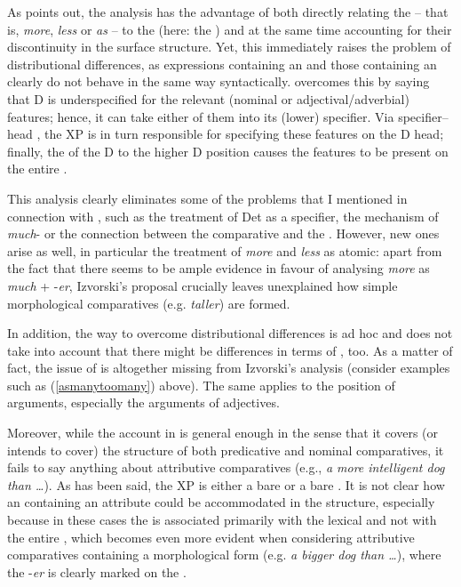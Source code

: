 As \citet[109--119]{izvorski1995} points out, the analysis has the advantage of both directly relating the  -- that is, \textit{more}, \textit{less} or \textit{as} -- to the  (here: the ) and at the same time accounting for their discontinuity in the surface structure. Yet, this immediately raises the problem of distributional differences, as  expressions containing an  and those containing an  clearly do not behave in the same way syntactically. \citet[111--120]{izvorski1995} overcomes this by saying that D is underspecified for the relevant (nominal or adjectival/adverbial) features; hence, it can take either of them into its (lower) specifier. Via specifier–head , the XP is in turn responsible for specifying these features on the D head; finally, the  of the D to the higher D position causes the features to be present on the entire .

This analysis clearly eliminates some of the problems that I mentioned in connection with \citet{bresnan1973}, such as the treatment of Det as a specifier, the mechanism of \textit{much}- or the connection between the comparative  and the . However, new ones arise as well, in particular the treatment of \textit{more} and \textit{less} as atomic: apart from the fact that there seems to be ample evidence in favour of analysing \textit{more} as \textit{much} + -\textit{er}, Izvorski's proposal crucially leaves unexplained how simple morphological comparatives (e.g. \textit{taller}) are formed.

In addition, the way to overcome distributional differences is ad hoc and does not take into account that there might be differences in terms of ,  too. As a matter of fact, the issue of  is altogether missing from Izvorski's analysis (consider examples such as (\ref{asmanytoomany}) above). The same applies to the position of arguments, especially the  arguments of adjectives.

Moreover, while the account in \citet{izvorski1995} is general enough in the sense that it covers (or intends to cover) the structure of both predicative and nominal comparatives, it fails to say anything about attributive comparatives (e.g., \textit{a more intelligent dog than \ldots}). As has been said, the XP is either a bare  or a bare . It is not clear how an  containing an attribute could be accommodated in the structure, especially because in these cases the  is associated primarily with the lexical  and not with the entire , which becomes even more evident when considering attributive comparatives containing a morphological  form (e.g. \textit{a bigger dog than \ldots}), where the  -\textit{er} is clearly marked on the .

